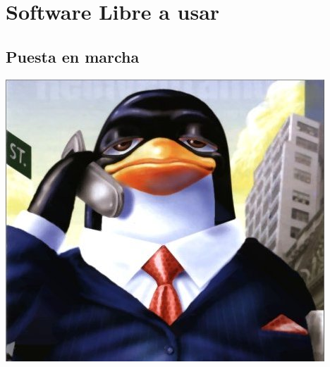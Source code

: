 %
%

\section{Software Libre a usar}

\subsection{Puesta en marcha}
\begin{frame}
        \includegraphics[width=\textwidth]{Licenciado-Tux.png}
\end{frame}

